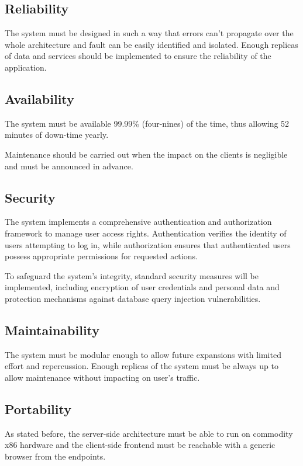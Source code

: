 \subsection{Reliability}
\label{subsec:reliability}%

\par The system must be designed in such a way that errors can’t propagate over the whole architecture and fault can be
easily identified and isolated. Enough replicas of data and services should be implemented to ensure the reliability of
the application.

\subsection{Availability}
\label{subsec:availability}%

\par The system must be available 99.99\% (four-nines) of the time, thus allowing 52 minutes of down-time yearly.

\par Maintenance should be carried out when the impact on the clients is negligible and must be announced in advance.

\subsection{Security}
\label{subsec:security}%

\par The system implements a comprehensive authentication and authorization framework to manage user access rights.
Authentication verifies the identity of users attempting to log in, while authorization ensures that authenticated
users possess appropriate permissions for requested actions.

\par To safeguard the system's integrity, standard security measures will be implemented, including encryption of user
credentials and personal data and protection mechanisms against database query injection vulnerabilities.

\subsection{Maintainability}
\label{subsec:maintainability}%

\par The system must be modular enough to allow future expansions with limited effort and repercussion. Enough replicas
of the system must be always up to allow maintenance without impacting on user’s traffic.

\subsection{Portability}
\label{subsec:portability}%

\par As stated before, the server-side architecture must be able to run on commodity x86 hardware and the client-side
frontend must be reachable with a generic browser from the endpoints.

